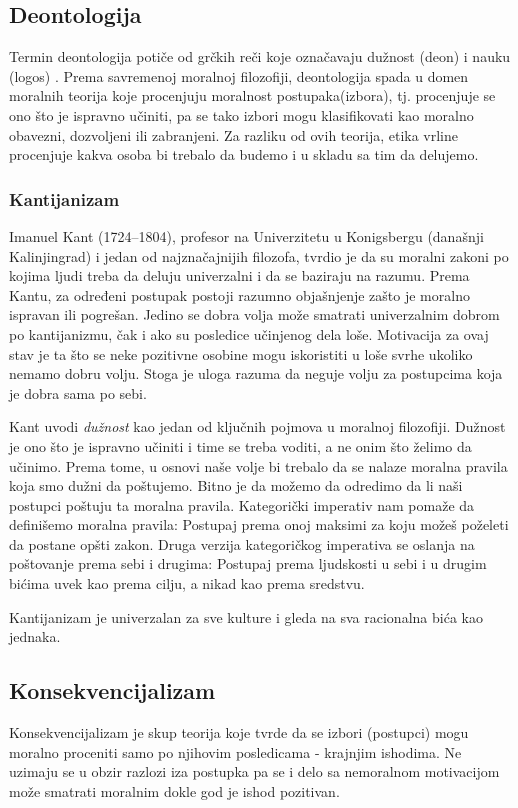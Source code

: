 \documentclass[a4paper]{article}
\begin{document}
\subsection{Deontologija}

Termin deontologija potiče od grčkih reči koje označavaju dužnost (deon) i nauku (logos) \cite{stanford}. Prema savremenoj moralnoj filozofiji, deontologija spada u domen moralnih teorija koje procenjuju moralnost postupaka(izbora), tj. procenjuje se ono što je ispravno učiniti, pa se tako izbori mogu klasifikovati kao moralno obavezni, dozvoljeni ili zabranjeni. Za razliku od ovih teorija, etika vrline procenjuje kakva osoba bi trebalo da budemo i u skladu sa tim da delujemo.

\subsubsection{Kantijanizam}

Imanuel Kant (1724–1804), profesor na Univerzitetu u Konigsbergu (današnji Kalinjingrad) i jedan od najznačajnijih filozofa, tvrdio je da su moralni zakoni po kojima ljudi treba da deluju univerzalni i da se baziraju na razumu. 
Prema Kantu, za određeni postupak postoji razumno objašnjenje zašto je moralno ispravan ili pogrešan.
Jedino se dobra volja može smatrati univerzalnim dobrom po kantijanizmu, čak i ako su posledice učinjenog dela loše.
Motivacija za ovaj stav je ta što se neke pozitivne osobine mogu iskoristiti u loše svrhe ukoliko nemamo dobru volju.
Stoga je uloga razuma da neguje volju za postupcima koja je dobra sama po sebi.

Kant uvodi \textit{dužnost} kao jedan od ključnih pojmova u moralnoj filozofiji. Dužnost je ono što je ispravno učiniti i time se treba voditi, a ne onim što želimo da učinimo.
Prema tome, u osnovi naše volje bi trebalo da se nalaze moralna pravila koja smo dužni da poštujemo. Bitno je da možemo da odredimo da li naši postupci poštuju ta moralna pravila.
Kategorički imperativ nam pomaže da definišemo moralna pravila: Postupaj prema onoj maksimi za koju možeš poželeti da postane opšti zakon.
Druga verzija kategoričkog imperativa se oslanja na poštovanje prema sebi i drugima: Postupaj prema ljudskosti u sebi i u drugim bićima uvek kao prema cilju, a nikad kao prema sredstvu.

Kantijanizam je univerzalan za sve kulture i gleda na sva racionalna bića kao jednaka.

\subsection{Konsekvencijalizam}
Konsekvencijalizam je skup teorija koje tvrde da se izbori (postupci) mogu moralno proceniti samo po njihovim posledicama - krajnjim ishodima. Ne uzimaju se u obzir razlozi iza postupka pa se i delo sa nemoralnom motivacijom može smatrati moralnim dokle god je ishod pozitivan. 
\end{document}
